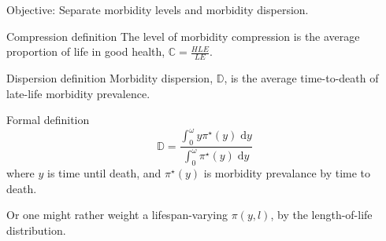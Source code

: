 \documentclass[20pt]{beamer}
\newcommand{\dd}{\; \mathrm{d}}
\begin{document}
\begin{frame}[plain]
\Large
\begin{block}{\Large Objective:}
Separate morbidity levels and morbidity dispersion.
\end{block}
\end{frame}

\begin{frame}[plain]
\Large
\begin{block}{\Large Compression definition}
The level of morbidity compression is the average proportion of life in good
health, $\mathbb{C} = \frac{HLE}{LE}$.
\end{block}
\end{frame}

\begin{frame}[plain]
\vspace{4em}
\Large
\begin{block}{\Large Dispersion definition}
Morbidity dispersion, $\mathbb{D}$, is the average time-to-death of late-life
morbidity prevalence.
\end{block}
\pause

\begin{block}{\Large Formal definition}
\begin{equation}
\mathbb{D} = \frac{\int_0^{\omega} y \pi^\star(y) \dd
y}{\int_0^{\omega}\pi^\star(y)\dd y}
\end{equation}
where $y$ is time until death, and $\pi^\star(y)$ is morbidity
prevalance by time to death.
\end{block}
\vspace{2em}
\pause
Or one might rather weight a lifespan-varying $\pi(y,l)$, by the length-of-life
distribution.

\end{frame}
\end{document}
